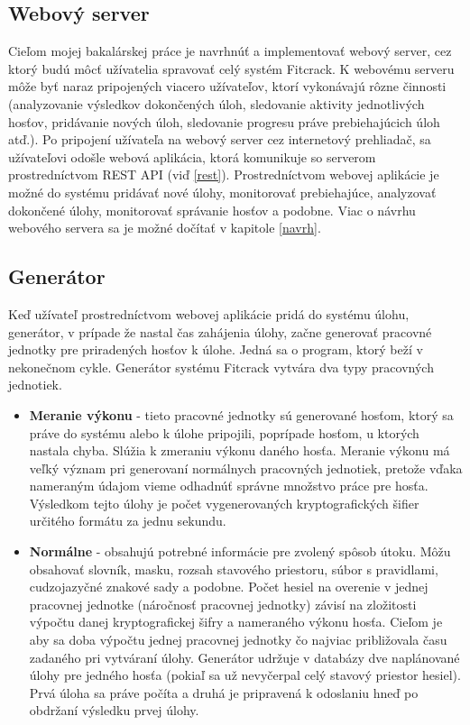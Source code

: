 \documentclass[slovak]{fitthesis}
\begin{document}
\subsection{Webový server}
Cieľom mojej bakalárskej práce je navrhnúť a implementovať webový server, cez ktorý budú môcť užívatelia spravovať celý systém Fitcrack. K webovému serveru môže byť naraz pripojených viacero užívateľov, ktorí vykonávajú rôzne činnosti (analyzovanie výsledkov dokončených úloh, sledovanie aktivity jednotlivých hosťov, pridávanie nových úloh, sledovanie progresu práve prebiehajúcich úloh atď.). Po pripojení užívateľa na webový server cez internetový prehliadač, sa užívateľovi odošle webová aplikácia, ktorá komunikuje so serverom prostredníctvom REST API (viď \ref{rest}). Prostredníctvom webovej aplikácie je možné do systému pridávať nové úlohy, monitorovať prebiehajúce, analyzovať dokončené úlohy, monitorovať správanie hosťov a podobne. Viac o návrhu webového servera sa je možné dočítať v kapitole \ref{navrh}.

\subsection{Generátor}
Keď užívateľ prostredníctvom webovej aplikácie pridá do systému úlohu, generátor, v prípade že nastal čas zahájenia úlohy, začne generovať pracovné jednotky pre priradených hosťov k úlohe. Jedná sa o program, ktorý beží v nekonečnom cykle. Generátor systému Fitcrack vytvára dva typy pracovných jednotiek.
\begin{itemize}
    \item \textbf{Meranie výkonu} - tieto pracovné jednotky sú generované hosťom, ktorý sa práve do systému alebo k úlohe pripojili, poprípade hosťom, u ktorých nastala chyba. Slúžia k zmeraniu výkonu daného hosťa. Meranie výkonu má veľký význam pri generovaní normálnych pracovných jednotiek, pretože vďaka nameraným údajom vieme odhadnúť správne množstvo práce pre hosťa. Výsledkom tejto úlohy je počet vygenerovaných kryptografických šifier určitého formátu za jednu sekundu. 
    \item \textbf{Normálne} - obsahujú potrebné informácie pre zvolený spôsob útoku. Môžu obsahovať slovník, masku, rozsah stavového priestoru, súbor s pravidlami, cudzojazyčné znakové sady a podobne. Počet hesiel na overenie v jednej pracovnej jednotke (náročnosť pracovnej jednotky) závisí na zložitosti výpočtu danej kryptografickej šifry a nameraného výkonu hosťa. Cieľom je aby sa doba výpočtu jednej pracovnej jednotky čo najviac približovala času zadaného pri vytváraní úlohy. Generátor udržuje v databázy dve naplánované úlohy pre jedného hosťa (pokiaľ sa už nevyčerpal celý stavový priestor hesiel). Prvá úloha sa práve počíta a druhá je pripravená k odoslaniu hneď po obdržaní výsledku prvej úlohy.
\end{itemize}
\end{document}
